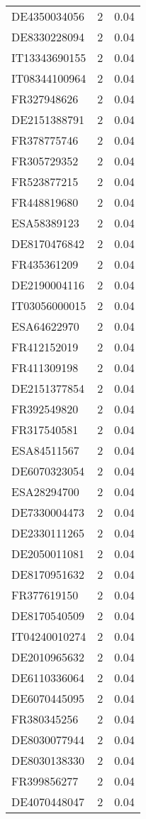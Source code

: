 \begin{table*}[htbp]
\begin{tabular}{lrr}
DE4350034056 & 2 & 0.04 \\
DE8330228094 & 2 & 0.04 \\
IT13343690155 & 2 & 0.04 \\
IT08344100964 & 2 & 0.04 \\
FR327948626 & 2 & 0.04 \\
DE2151388791 & 2 & 0.04 \\
FR378775746 & 2 & 0.04 \\
FR305729352 & 2 & 0.04 \\
FR523877215 & 2 & 0.04 \\
FR448819680 & 2 & 0.04 \\
ESA58389123 & 2 & 0.04 \\
DE8170476842 & 2 & 0.04 \\
FR435361209 & 2 & 0.04 \\
DE2190004116 & 2 & 0.04 \\
IT03056000015 & 2 & 0.04 \\
ESA64622970 & 2 & 0.04 \\
FR412152019 & 2 & 0.04 \\
FR411309198 & 2 & 0.04 \\
DE2151377854 & 2 & 0.04 \\
FR392549820 & 2 & 0.04 \\
FR317540581 & 2 & 0.04 \\
ESA84511567 & 2 & 0.04 \\
DE6070323054 & 2 & 0.04 \\
ESA28294700 & 2 & 0.04 \\
DE7330004473 & 2 & 0.04 \\
DE2330111265 & 2 & 0.04 \\
DE2050011081 & 2 & 0.04 \\
DE8170951632 & 2 & 0.04 \\
FR377619150 & 2 & 0.04 \\
DE8170540509 & 2 & 0.04 \\
IT04240010274 & 2 & 0.04 \\
DE2010965632 & 2 & 0.04 \\
DE6110336064 & 2 & 0.04 \\
DE6070445095 & 2 & 0.04 \\
FR380345256 & 2 & 0.04 \\
DE8030077944 & 2 & 0.04 \\
DE8030138330 & 2 & 0.04 \\
FR399856277 & 2 & 0.04 \\
DE4070448047 & 2 & 0.04 \\

\end{tabular}
\end{table*}

